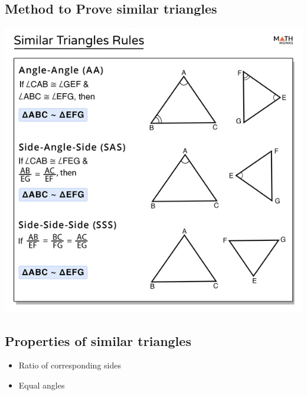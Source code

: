 \documentclass{article}
\begin{document}
\subsection{Method to Prove similar triangles}
\includegraphics[scale=.7]{Similar-Triangles-Rules.jpg}
\subsection{Properties of similar triangles}
\begin{itemize}
    \item Ratio of corresponding sides
    \item Equal angles
\end{itemize}
\pagebreak
\end{document}
